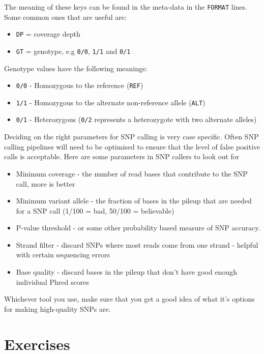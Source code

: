 \documentclass[12pt,]{book}
\providecommand{\tightlist}{%
  \setlength{\itemsep}{0pt}\setlength{\parskip}{0pt}}
\begin{document}
The meaning of these keys can be found in the meta-data in the
\texttt{FORMAT} lines. Some common ones that are useful are:

\begin{itemize}
\tightlist
\item
  \texttt{DP} = coverage depth
\item
  \texttt{GT} = genotype, e.g \texttt{0/0}, \texttt{1/1} and
  \texttt{0/1}
\end{itemize}

Genotype values have the following meanings:

\begin{itemize}
\tightlist
\item
  \texttt{0/0} - Homozygous to the reference (\texttt{REF})
\item
  \texttt{1/1} - Homozygous to the alternate non-reference allele
  (\texttt{ALT})
\item
  \texttt{0/1} - Heterozygous (\texttt{0/2} represents a heterozygote
  with two alternate alleles)
\end{itemize}

Deciding on the right parameters for SNP calling is very case specific.
Often SNP calling pipelines will need to be optimised to ensure that the
level of false positive calls is acceptable. Here are some parameters in
SNP callers to look out for

\begin{itemize}
\tightlist
\item
  Minimum coverage - the number of read bases that contribute to the SNP
  call, more is better
\item
  Minimum variant allele - the fraction of bases in the pileup that are
  needed for a SNP call (1/100 = bad, 50/100 = believable)
\item
  P-value threshold - or some other probability based measure of SNP
  accuracy.
\item
  Strand filter - discard SNPs where most reads come from one strand -
  helpful with certain sequencing errors
\item
  Base quality - discard bases in the pileup that don't have good enough
  individual Phred scores
\end{itemize}

Whichever tool you use, make sure that you get a good idea of what it's
options for making high-quality SNPs are.

\section{Exercises}\label{exercises-2}
\end{document}
